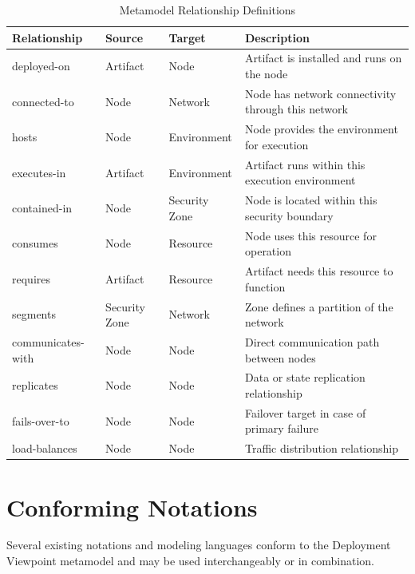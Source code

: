 \documentclass[11pt,letterpaper]{article}
\begin{document}
\begin{table}[H]
\centering
\caption{Metamodel Relationship Definitions}
\small
\begin{tabular}{@{}L{2.8cm}L{2cm}L{2cm}L{6.5cm}@{}}
\toprule
\textbf{Relationship} & \textbf{Source} & \textbf{Target} & \textbf{Description} \\
\midrule
deployed-on & Artifact & Node & Artifact is installed and runs on the node \\
\addlinespace
connected-to & Node & Network & Node has network connectivity through this network \\
\addlinespace
hosts & Node & Environment & Node provides the environment for execution \\
\addlinespace
executes-in & Artifact & Environment & Artifact runs within this execution environment \\
\addlinespace
contained-in & Node & Security Zone & Node is located within this security boundary \\
\addlinespace
consumes & Node & Resource & Node uses this resource for operation \\
\addlinespace
requires & Artifact & Resource & Artifact needs this resource to function \\
\addlinespace
segments & Security Zone & Network & Zone defines a partition of the network \\
\addlinespace
communicates-with & Node & Node & Direct communication path between nodes \\
\addlinespace
replicates & Node & Node & Data or state replication relationship \\
\addlinespace
fails-over-to & Node & Node & Failover target in case of primary failure \\
\addlinespace
load-balances & Node & Node & Traffic distribution relationship \\
\bottomrule
\end{tabular}
\end{table}

\section{Conforming Notations}

Several existing notations and modeling languages conform to the Deployment Viewpoint metamodel and may be used interchangeably or in combination.
\end{document}
